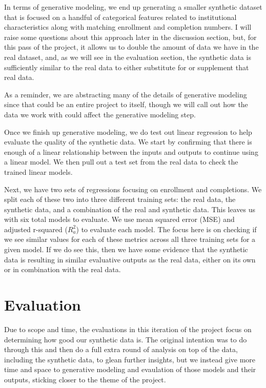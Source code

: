 \documentclass[sigconf, authorversion, nonacm]{acmart}
\begin{document}
        In terms of generative modeling, we end up generating a smaller synthetic dataset that is focused on a handful of categorical features related to institutional characteristics along with matching enrollment and completion numbers. I will raise some questions about this approach later in the discussion section, but, for this pass of the project, it allows us to double the amount of data we have in the real dataset, and, as we will see in the evaluation section, the synthetic data is sufficiently similar to the real data to either substitute for or supplement that real data.

        As a reminder, we are abstracting many of the details of generative modeling since that could be an entire project to itself, though we will call out how the data we work with could affect the generative modeling step.

        Once we finish up generative modeling, we do test out linear regression to help evaluate the quality of the synthetic data. We start by confirming that there is enough of a linear relationship between the inputs and outputs to continue using a linear model. We then pull out a test set from the real data to check the trained linear models.

        Next, we have two sets of regressions focusing on enrollment and completions. We split each of these two into three different training sets: the real data, the synthetic data, and a combination of the real and synthetic data. This leaves us with six total models to evaluate. We use mean squared error (MSE) and adjusted r-squared ($R^2_a$) to evaluate each model. The focus here is on checking if we see similar values for each of these metrics across all three training sets for a given model. If we do see this, then we have some evidence that the synthetic data is resulting in similar evaluative outputs as the real data, either on its own or in combination with the real data.

\section{Evaluation}
    Due to scope and time, the evaluations in this iteration of the project focus on determining how good our synthetic data is. The original intention was to do through this and then do a full extra round of analysis on top of the data, including the synthetic data, to glean further insights, but we instead give more time and space to generative modeling and evaulation of those models and their outputs, sticking closer to the theme of the project.
\end{document}
